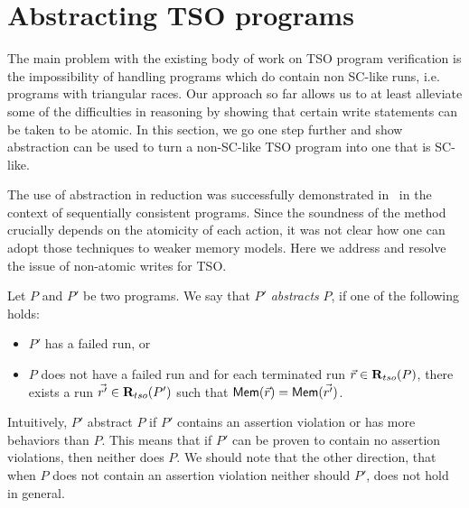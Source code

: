 \documentclass[preprint,9pt]{sigplanconf}
\begin{document}
\section{Abstracting TSO programs}
\label{sec:abstracting-tso-programs}
The main problem with the existing body of work on TSO program verification is the impossibility of handling programs which do contain non SC-like runs, i.e. programs with triangular races.
Our approach so far allows us to at least alleviate some of the difficulties in reasoning by showing that certain write statements can be taken to be atomic.
In this section, we go one step further and show abstraction can be used to turn a non-SC-like TSO program into one that is SC-like.

The use of abstraction in reduction was successfully demonstrated in~\cite{EQT2009} in the context of sequentially consistent programs.
Since the soundness of the method crucially depends on the atomicity of each action, it was not clear how one can adopt those techniques to weaker memory models.
Here we address and resolve the issue of non-atomic writes for TSO.

\begin{definition}
Let $P$ and $P'$ be two programs.
We say that $P'$ {\em abstracts} $P$, if one of the following holds:
\begin{itemize}
\item $P'$ has a failed run, or
\item $P$ does not have a failed run and for each terminated run $\vec{r}\in\mathbf{R}_{tso}(P)$, there exists a run $\vec{r'}\in\mathbf{R}_{tso}(P')$ such that $\mathsf{Mem}(\vec{r}) = \mathsf{Mem}(\vec{r'})$.
\end{itemize}
\end{definition}
Intuitively, $P'$ abstract $P$ if $P'$ contains an assertion violation or has more behaviors than $P$.
This means that if $P'$ can be proven to contain no assertion violations, then neither does $P$.
We should note that the other direction, that when $P$ does not contain an assertion violation neither should $P'$, does not hold in general.
\end{document}
